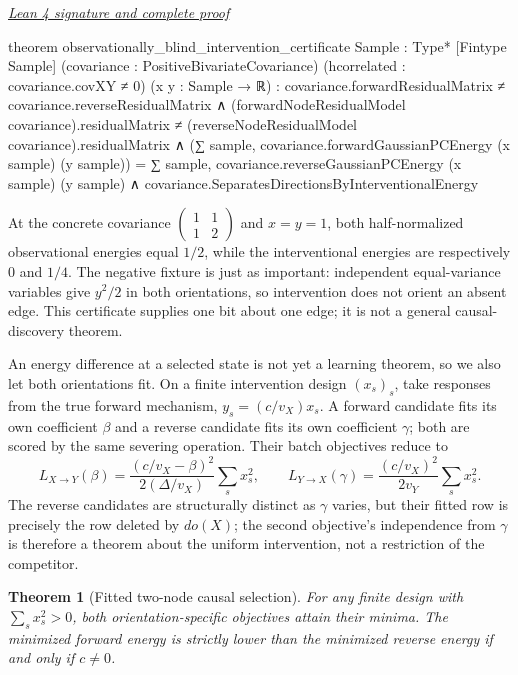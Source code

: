 \documentclass[11pt]{article}
\newtheorem{theorem}{Theorem}[section]
\newcommand{\leancommit}{647168959fc57cfe97526d9525d33e63681b8e2f}
\newcommand{\leansignaturelink}[2]{%
  \par\Needspace{0.3\textheight}\smallskip\noindent
  \href{https://github.com/zariuq/MeTTapedia/blob/\leancommit/#1\#L#2}{%
    \scriptsize\itshape Lean 4 signature and complete proof}\par\nobreak}
\begin{document}
\leansignaturelink{lean/mettapedia/Mettapedia/MachineLearning/NeuralNetworks/%
PredictiveCoding/CausalDirectionIdentifiability.lean}{866}
\begin{leansignature}
theorem observationally_blind_intervention_certificate
    {Sample : Type*} [Fintype Sample]
    (covariance : PositiveBivariateCovariance)
    (hcorrelated : covariance.covXY ≠ 0) (x y : Sample → ℝ) :
    covariance.forwardResidualMatrix ≠ covariance.reverseResidualMatrix ∧
      (forwardNodeResidualModel covariance).residualMatrix ≠
        (reverseNodeResidualModel covariance).residualMatrix ∧
      (∑ sample, covariance.forwardGaussianPCEnergy (x sample) (y sample)) =
        ∑ sample, covariance.reverseGaussianPCEnergy (x sample) (y sample) ∧
      covariance.SeparatesDirectionsByInterventionalEnergy
\end{leansignature}

At the concrete covariance $\left(\begin{smallmatrix}1&1\\1&2\end{smallmatrix}\right)$
and $x=y=1$, both half-normalized observational energies equal $1/2$, while the
interventional energies are respectively $0$ and $1/4$.  The negative fixture is just
as important: independent equal-variance variables give $y^2/2$ in both orientations,
so intervention does not orient an absent edge.  This certificate supplies one bit about
one edge; it is not a general causal-discovery theorem.

An energy difference at a selected state is not yet a learning theorem, so we also let
both orientations fit.  On a finite intervention design $(x_s)_s$, take responses from
the true forward mechanism, $y_s=(c/v_X)x_s$.  A forward candidate fits its own
coefficient $\beta$ and a reverse candidate fits its own coefficient $\gamma$; both are
scored by the same severing operation.  Their batch objectives reduce to
\[
L_{X\to Y}(\beta)
 = \frac{(c/v_X-\beta)^2}{2(\Delta/v_X)}\sum_s x_s^2,
\qquad
L_{Y\to X}(\gamma)
 = \frac{(c/v_X)^2}{2v_Y}\sum_s x_s^2.
\]
The reverse candidates are structurally distinct as $\gamma$ varies, but their fitted
row is precisely the row deleted by $do(X)$; the second objective's independence from
$\gamma$ is therefore a theorem about the uniform intervention, not a restriction of
the competitor.

\begin{theorem}[Fitted two-node causal selection]\label{thm:causalselection}
For any finite design with $\sum_s x_s^2>0$, both orientation-specific objectives attain
their minima.  The minimized forward energy is strictly lower than the minimized reverse
energy if and only if $c\ne0$.
\end{theorem}
\end{document}
